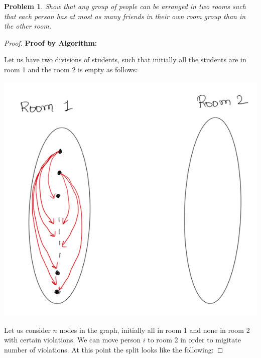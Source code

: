 \documentclass[12pt]{article}
\newtheorem{problem}{Problem}
\begin{document}
\begin{problem}
Show that any group of people can be arranged in two rooms such that each person has at most as many friends in their own room group than in the other room.
\end{problem}
\begin{proof}

\textbf{Proof by Algorithm:}

Let us have two divisions of students, such that initially all the students are in room 1 and the room 2 is empty as follows:

\begin{center}
\includegraphics[width=16cm, keepaspectratio]{1}
\end{center}

Let us consider $n$ nodes in the graph, initially all in room 1 and none in room 2 with certain violations. We can move person $i$ to room 2 in order to migitate number of violations. At this point the split looks like the following:


\end{proof}
\end{document}
